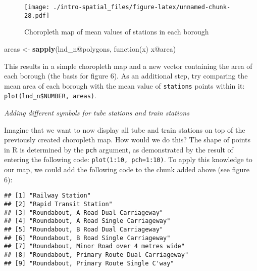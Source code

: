 \documentclass[]{article}
\newenvironment{Shaded}{}{}
\newcommand{\KeywordTok}[1]{\textcolor[rgb]{0.00,0.44,0.13}{\textbf{{#1}}}}
\newcommand{\DataTypeTok}[1]{\textcolor[rgb]{0.56,0.13,0.00}{{#1}}}
\newcommand{\StringTok}[1]{\textcolor[rgb]{0.25,0.44,0.63}{{#1}}}
\newcommand{\CommentTok}[1]{\textcolor[rgb]{0.38,0.63,0.69}{\textit{{#1}}}}
\newcommand{\NormalTok}[1]{{#1}}
\begin{document}
\begin{figure}[htbp]
\centering
\texttt{[image: ./intro-spatial\_files/figure-latex/unnamed-chunk-28.pdf]}
\caption{Choropleth map of mean values of stations in each borough}
\end{figure}

\begin{Shaded}
\begin{Highlighting}[]
\NormalTok{areas <-}\StringTok{ }\KeywordTok{sapply}\NormalTok{(lnd_n@polygons, function(x) x@area)}
\end{Highlighting}
\end{Shaded}

This results in a simple choropleth map and a new vector containing the
area of each borough (the basis for figure 6). As an additional step,
try comparing the mean area of each borough with the mean value of
\texttt{stations} points within it:
\texttt{plot(lnd\_n\$NUMBER, areas)}.

\emph{Adding different symbols for tube stations and train stations}

Imagine that we want to now display all tube and train stations on top
of the previously created choropleth map. How would we do this? The
shape of points in R is determined by the \texttt{pch} argument, as
demonstrated by the result of entering the following code:
\texttt{plot(1:10, pch=1:10)}. To apply this knowledge to our map, we
could add the following code to the chunk added above (see figure 6):

\begin{Shaded}
\end{Shaded}

\begin{verbatim}
## [1] "Railway Station"                           
## [2] "Rapid Transit Station"                     
## [3] "Roundabout, A Road Dual Carriageway"       
## [4] "Roundabout, A Road Single Carriageway"     
## [5] "Roundabout, B Road Dual Carriageway"       
## [6] "Roundabout, B Road Single Carriageway"     
## [7] "Roundabout, Minor Road over 4 metres wide" 
## [8] "Roundabout, Primary Route Dual Carriageway"
## [9] "Roundabout, Primary Route Single C'way"
\end{verbatim}
\end{document}
